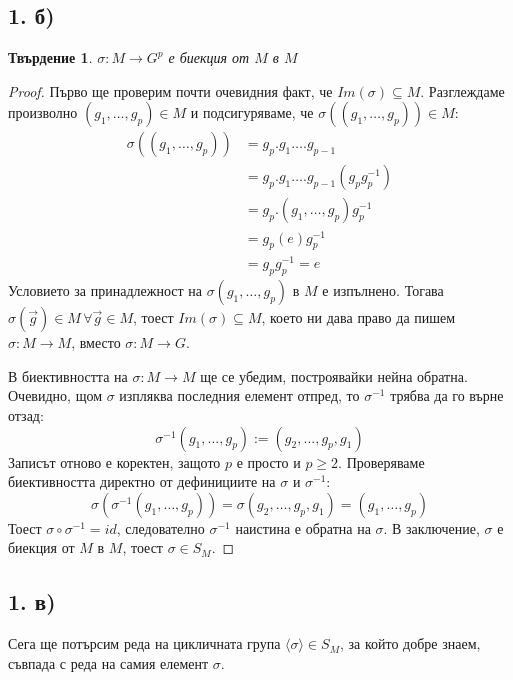 \documentclass{article}
\newtheorem*{prop}{Твърдение}
\newcommand{\grsigma}[0]{{\langle \sigma \rangle}}
\begin{document}
\subsection*{1. б)}
\begin{prop}
    $\sigma : M \to G^p$ е биекция от $M$ в $M$
\end{prop}
\begin{proof}
    Първо ще проверим почти очевидния факт, че $Im(\sigma) \subseteq M$.
    Разглеждаме произволно $(g_1,\dots, g_p) \in M$ и подсигуряваме, че ${\sigma((g_1,\dots, g_p)) \in M}$:
    \begin{align*}
        \sigma((g_1,\dots, g_p)) &= g_p.g_1\dots.g_{p-1}\\
        &= g_p.g_1\dots.g_{p-1}(g_p g_p^{-1})\\
        &= g_p.(g_1,\dots, g_p)g_p^{-1}\\
        &= g_p(e)g_p^{-1} \\
        &= g_p g_p^{-1} = e
    \end{align*}
    Условието за принадлежност на $\sigma (g_1,\dots, g_p)$ в $M$ е изпълнено.
    Тогава $\sigma(\vec g) \in M \, \forall \vec g \in M$, тоест $Im(\sigma) \subseteq M$, което ни дава право да пишем $\sigma : M \to M$, вместо $\sigma : M \to G$.

    В биективността на $\sigma : M \to M$ ще се убедим, построявайки нейна обратна. Очевидно, щом $\sigma$ изпляква последния елемент отпред, то $\sigma^{-1}$ трябва да го върне отзад:
    \begin{equation*}
        \sigma^{-1}(g_1, \dots, g_p) := (g_2, \dots, g_p, g_1)
    \end{equation*}
    Записът отново е коректен, защото $p$ е просто и $p \ge 2$.
    Проверяваме биективността директно от дефинициите на $\sigma$ и $\sigma^{-1}$:
    \begin{equation*}
        \sigma(\sigma^{-1}(g_1,\dots,g_p)) = \sigma(g_2,\dots,g_p,g_1) = (g_1, \dots, g_p)
    \end{equation*}
    Тоест $\sigma \circ \sigma^{-1} = id$, следователно $\sigma^{-1}$ наистина е обратна на $\sigma$. В заключение, $\sigma$ е биекция от $M$ в $M$, тоест $\sigma \in S_M$.
\end{proof}

\subsection*{1. в)}
Сега ще потърсим реда на цикличната група $\grsigma \in S_M$, за който добре знаем, съвпада с реда на самия елемент $\sigma$.
\end{document}
